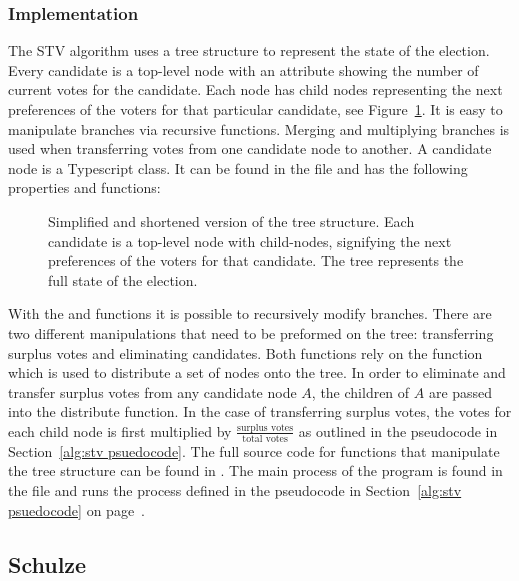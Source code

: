 \documentclass[12pt]{article}
\begin{document}
\subsubsection{Implementation}
The STV algorithm uses a tree structure to represent the state of the election. Every candidate is a top-level node with an attribute showing the number of current votes for the candidate. Each node has child nodes representing the next preferences of the voters for that particular candidate, see Figure~\ref{fig:tree structure}. It is easy to manipulate branches via recursive functions. Merging and multiplying branches is used when transferring votes from one candidate node to another. A candidate node is a Typescript class. It can be found in the  file and has the following properties and functions:
\begin{figure}
	\centering
	
	\caption{Simplified and shortened version of the tree structure. Each candidate is a top-level node with child-nodes, signifying the next preferences of the voters for that candidate. The tree represents the full state of the election.}
\label{fig:tree structure}
\end{figure}
With the  and  functions it is possible to recursively modify branches. There are two different manipulations that need to be preformed on the tree: transferring surplus votes and eliminating candidates. Both functions rely on the  function which is used to distribute a set of nodes onto the tree.
In order to eliminate and transfer surplus votes from any candidate node $A$, the children of $A$ are passed into the distribute function. In the case of transferring surplus votes, the votes for each child node is first multiplied by $\frac{\text{surplus votes}}{\text{total votes}}$ as outlined in the pseudocode in Section~\ref{alg:stv psuedocode}. The full source code for functions that manipulate the tree structure can be found in .
The main process of the program is found in the  file and runs the process defined in the pseudocode in Section~\ref{alg:stv psuedocode} on page~\pageref{alg:stv psuedocode}.
\subsection{Schulze}
\end{document}
